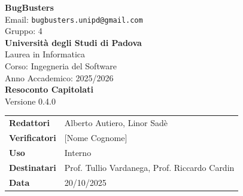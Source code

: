 \documentclass[a4paper,11pt]{article}
\newcommand{\CurrentVersion}{0.4.0} %
\begin{document}
\pagestyle{fancy}
\fancyhf{} %


\fancyfoot[R]{ \nouppercase{\rightmark}} %


\renewcommand{\headrulewidth}{0pt}  %
\renewcommand{\footrulewidth}{0pt}  %


\begin{center}
  \thispagestyle{empty}
  {\Large\bfseries BugBusters}\\[0.3cm]
  {\small\color{darkgray} Email: \texttt{bugbusters.unipd@gmail.com}} \\[0.1cm]
  {\small\color{darkgray} Gruppo: 4} \\[0.5cm]

  {\large\bfseries Università degli Studi di Padova}\\[0.3cm]
  {\small Laurea in Informatica}\\[0.2cm]
  {\small Corso: Ingegneria del Software}\\[0.2cm]
  {\small Anno Accademico: 2025/2026}\\[0.8cm]

  {\Huge\bfseries Resoconto Capitolati}\\[0.8cm]
  {\Large Versione \CurrentVersion}\\[0.8cm]
\end{center}

\begin{center}
\begin{tcolorbox}[colback=lightgray,width=0.85\textwidth,arc=3mm,boxrule=0.5pt]
\begin{tabular}{@{}ll@{}}
\textbf{Redattori}    & Alberto Autiero, Linor Sadè\\
\textbf{Verificatori} & [Nome Cognome] \\
\textbf{Uso}          & Interno \\
\textbf{Destinatari}  & Prof. Tullio Vardanega, Prof. Riccardo Cardin \\
\textbf{Data}         & 20/10/2025 \\
\end{tabular}
\end{tcolorbox}
\end{center}
\end{document}
